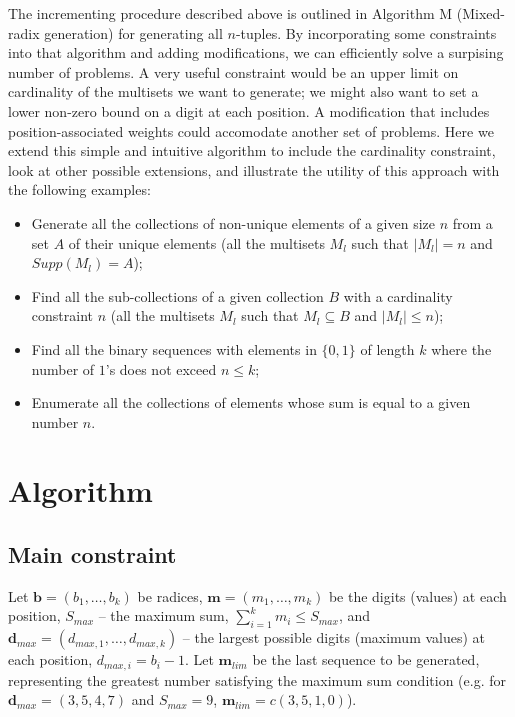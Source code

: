 \documentclass[12pt]{article}
\begin{document}
The incrementing procedure described above is outlined in \cite{knuth2011art} Algorithm M (Mixed-radix generation) for generating all $n$-tuples. By incorporating some constraints into that algorithm and adding modifications, we can efficiently solve a surpising number of problems. A very useful constraint would be an upper limit on cardinality of the multisets we want to generate; we might also want to set a lower non-zero bound on a digit at each position. A modification that includes position-associated weights could accomodate another set of problems. Here we extend this simple and intuitive algorithm to include the cardinality constraint, look at other possible extensions, and illustrate the utility of this approach with the following examples: 
\begin{itemize}
  \item Generate all the collections of non-unique elements of a given size $n$ from a set $A$ of their unique elements (all the multisets $M_l$ such that $|M_l| = n$ and $Supp(M_l) = A$);
  \item Find all the sub-collections of a given collection $B$ with a cardinality constraint $n$ (all the multisets $M_l$ such that $M_l \subseteq B$ and $|M_l| \leqslant n$);
  \item Find all the binary sequences with elements in $\{0, 1\}$ of length $k$ where the number of $1$'s does not exceed $n \leqslant k$; 
  \item Enumerate all the collections of elements whose sum is equal to a given number $n$.
\end{itemize}

\section{Algorithm}
\subsection{Main constraint}

Let $\boldsymbol{b} = (b_1, \dotsc, b_k)$ be radices, $\boldsymbol{m} = (m_1, \dotsc, m_k)$ be the digits (values) at each position, $S_{max}$ -- the maximum sum, $\sum_{i = 1}^{k} m_i \leqslant S_{max}$, and $\boldsymbol{d}_{max} = (d_{max, 1}, \dotsc, d_{max, k})$ -- the largest possible digits (maximum values) at each position, $d_{max, i} = b_i - 1$. Let $\boldsymbol{m}_{lim}$ be the last sequence to be generated, representing the greatest number satisfying the maximum sum condition (e.g. for $\boldsymbol{d}_{max} = (3, 5, 4, 7)$ and $S_{max} = 9$, $\boldsymbol{m}_{lim} = c(3, 5, 1, 0)$). \\ 
\end{document}
